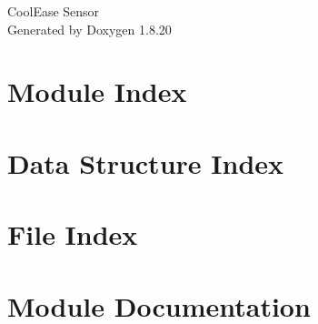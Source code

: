 \let\mypdfximage\pdfximage\def\pdfximage{\immediate\mypdfximage}\documentclass[twoside]{book}
\newcommand{\+}{\discretionary{\mbox{\scriptsize$\hookleftarrow$}}{}{}}
\newcommand{\clearemptydoublepage}{%
  \newpage{\pagestyle{empty}\cleardoublepage}%
}
\begin{document}
\hypersetup{pageanchor=false,
             bookmarksnumbered=true,
             pdfencoding=unicode
            }
\begin{titlepage}
\vspace*{7cm}
\begin{center}%
{\Large Cool\+Ease Sensor }\\
\vspace*{1cm}
{\large Generated by Doxygen 1.8.20}\\
\end{center}
\end{titlepage}
\clearemptydoublepage
{}
\tableofcontents
\clearemptydoublepage
{}
\hypersetup{pageanchor=true}

\chapter{Module Index}

\chapter{Data Structure Index}

\chapter{File Index}

\chapter{Module Documentation}

























\end{document}
